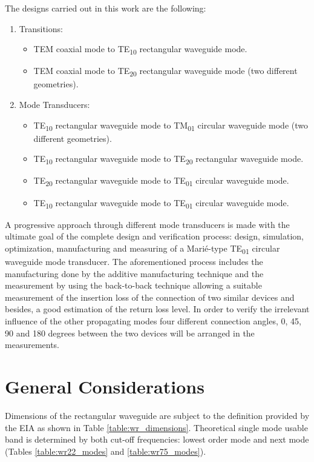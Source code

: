 \documentclass[english,twoside]{article}
\begin{document}
		The designs carried out in this work are the following:		
		\begin{enumerate}
			\item Transitions:
			\begin{itemize}
				\item \ac{TEM} coaxial mode to \ac{TE}\textsubscript{10} rectangular waveguide mode.
				\item \ac{TEM} coaxial mode to \ac{TE}\textsubscript{20} rectangular waveguide mode (two different geometries).
			\end{itemize}
			\item Mode Transducers:
			\begin{itemize}
				\item \ac{TE}\textsubscript{10} rectangular waveguide mode to \ac{TM}\textsubscript{01} circular waveguide mode (two different geometries).
				\item \ac{TE}\textsubscript{10} rectangular waveguide mode to \ac{TE}\textsubscript{20} rectangular waveguide mode.
				\item \ac{TE}\textsubscript{20} rectangular waveguide mode to \ac{TE}\textsubscript{01} circular waveguide mode. 
				\item \ac{TE}\textsubscript{10} rectangular waveguide mode to \ac{TE}\textsubscript{01} circular waveguide mode.
			\end{itemize}
		\end{enumerate}
		
		A progressive approach through different mode transducers is made with the ultimate goal of the complete design and verification process: design, simulation, optimization, manufacturing and measuring of a Marié-type \ac{TE}\textsubscript{01} circular waveguide mode transducer. The aforementioned process includes the manufacturing done by the additive manufacturing technique and the measurement by using the back-to-back technique allowing a suitable measurement of the insertion loss of the connection of two similar devices and besides, a good estimation of the return loss level. In order to verify the irrelevant influence of the other propagating modes four different connection angles, 0, 45, 90 and 180 degrees between the two devices will be arranged in the measurements.
	
  

	\newpage
	\section{General Considerations}
		Dimensions of the rectangular waveguide are subject to the definition provided by the \ac{EIA} as shown in Table \ref{table:wr_dimensions}. Theoretical single mode usable band is determined by both cut-off frequencies: lowest order mode and next mode (Tables \ref{table:wr22_modes} and \ref{table:wr75_modes}).\\
		
\end{document}
